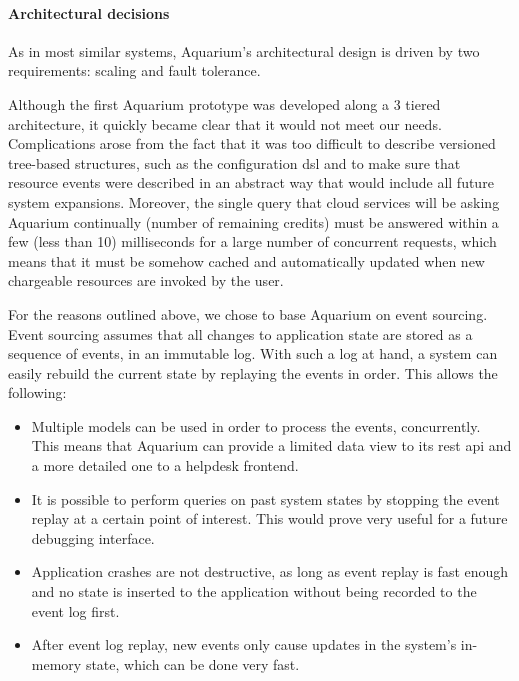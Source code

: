 \paragraph{Architectural decisions} As in most similar systems, Aquarium's
architectural design is driven by two requirements: scaling and fault
tolerance.

Although the first Aquarium prototype was developed along a 3 tiered
architecture, it quickly became clear that it would not meet our
needs. Complications arose from the fact that it was too difficult to
describe versioned tree-based structures, such as the configuration
{\sc dsl} and to make sure that resource events were described in an
abstract way that would include all future system expansions.
Moreover, the single query that cloud services will be asking Aquarium
continually (number of remaining credits) must be answered within a
few (less than 10) milliseconds for a large number of concurrent
requests, which means that it must be somehow cached and automatically
updated when new chargeable resources are invoked by the user.

For the reasons outlined above, we chose to base Aquarium on event
sourcing. Event sourcing assumes that all changes to application state
are stored as a sequence of events, in an immutable log. With such a
log at hand, a system can easily rebuild the current state by
replaying the events in order. This allows the following:

\begin{itemize}

    \item Multiple models can be used in order to process the events, 
        concurrently. This means that Aquarium can provide a limited
        data view to its {\sc rest api} and a more detailed one to a
        helpdesk frontend.

      \item It is possible to perform queries on past system states by
        stopping the event replay at a certain point of interest. This
        would prove very useful for a future debugging interface.

      \item Application crashes are not destructive, as long as event
        replay is fast enough and no state is inserted to the
        application without being recorded to the event log first.

      \item After event log replay, new events only cause updates in
        the system's in-memory state, which can be done very fast.

\end{itemize}


